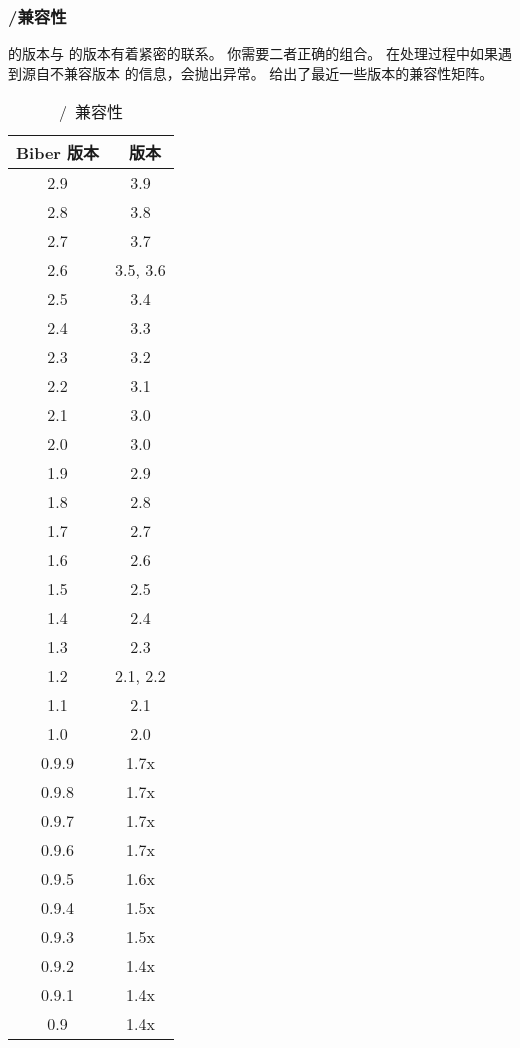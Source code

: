 \subsubsection{\biber/\biblatex 兼容性}
\label{int:pre:bibercompat}


\biber 的版本与 \biblatex 的版本有着紧密的联系。
你需要二者正确的组合。
在处理过程中如果遇到源自不兼容版本 \biblatex 的信息，\biber 会抛出异常。
 给出了最近一些版本的兼容性矩阵。

\begin{table}
	\tablesetup\centering
	\begin{tabular}{cc}
		\toprule
		\sffamily\bfseries\spotcolor Biber 版本
		& \sffamily\bfseries\spotcolor \biblatex\ 版本\\
		\midrule
		2.9 & 3.9\\
		2.8 & 3.8\\
		2.7 & 3.7\\
		2.6 & 3.5, 3.6\\
		2.5 & 3.4\\
		2.4 & 3.3\\
		2.3 & 3.2\\
		2.2 & 3.1\\
		2.1 & 3.0\\
		2.0 & 3.0\\
		1.9 & 2.9\\
		1.8 & 2.8\\
		1.7 & 2.7\\
		1.6 & 2.6\\
		1.5 & 2.5\\
		1.4 & 2.4\\
		1.3 & 2.3\\
		1.2 & 2.1, 2.2\\
		1.1 & 2.1\\
		1.0 & 2.0\\
		0.9.9 & 1.7x\\
		0.9.8 & 1.7x\\
		0.9.7 & 1.7x\\
		0.9.6 & 1.7x\\
		0.9.5 & 1.6x\\
		0.9.4 & 1.5x\\
		0.9.3 & 1.5x\\
		0.9.2 & 1.4x\\
		0.9.1 & 1.4x\\
		0.9 & 1.4x\\
		\bottomrule
	\end{tabular}
	\caption{\biber/\biblatex\ 兼容性}
	\label{tab:int:pre:bibercompat}
\end{table}
